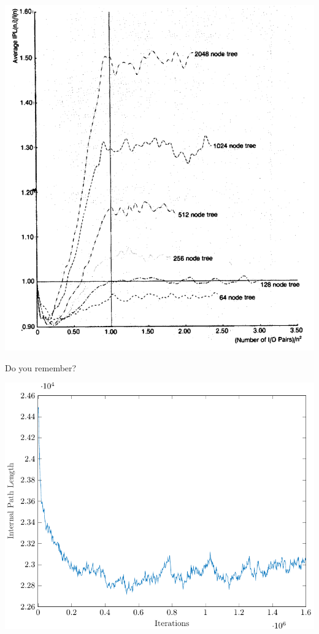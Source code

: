 \documentclass{beamer}
\begin{document}
\begin{frame}[plain]
    \begin{center}
        \includegraphics[width=\paperwidth,height=\paperheight,keepaspectratio]{plotEppinger.png}
    \end{center}
\end{frame}

\begin{frame}
    Do you remember?
    \begin{center}
        \includegraphics[scale=0.70]{iplDelete.pdf}
    \end{center}
\end{frame}
\end{document}
